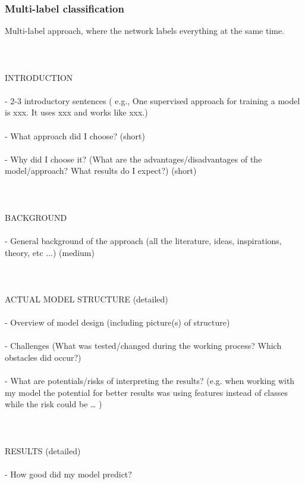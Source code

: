\subsubsection{Multi-label classification}

Multi-label approach, where the network labels everything at the same time. \\
\\
\\
\\
INTRODUCTION \\
\\
- 2-3 introductory sentences ( e.g., One supervised approach for training a model is xxx. It uses xxx and works like xxx.) \\
\\
- What approach did I choose? (short) \\
\\
- Why did I choose it? (What are the advantages/disadvantages of the model/approach? What results do I expect?) (short) \\
\\
\\
\\
BACKGROUND \\
\\
- General background of the approach (all the literature, ideas, inspirations, theory, etc ...) (medium) \\
\\
\\
\\
ACTUAL MODEL STRUCTURE (detailed) \\
\\
- Overview of model design (including picture(s) of structure) \\
\\
- Challenges (What was tested/changed during the working process? Which obstacles did occur?) \\
\\
- What are potentials/risks of interpreting the results? (e.g. when working with my model the potential for better results was using features instead of classes while the risk could be … ) \\
\\
\\
\\
RESULTS (detailed) \\
\\
- How good did my model predict? \\
\\
